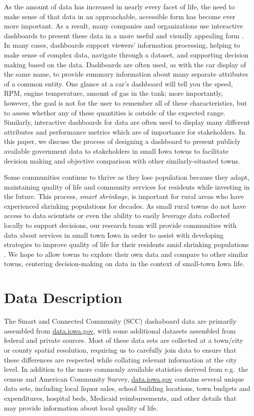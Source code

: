 \documentclass[letterpaper,inpress]{jdsart}
\begin{document}
As the amount of data has increased in nearly every facet of life, the need to make sense of that data in an approachable, accessible form has become ever more important.
As a result, many companies and organizations use interactive dashboards to present these data in a more useful and visually appealing form \citep{fisher}.
In many cases, dashboards support viewers' information processing, helping to make sense of complex data, navigate through a dataset, and supporting decision making based on the data.
Dashboards are often used, as with the car display of the same name, to provide summary information about many separate attributes of a common entity. One glance at a car's dashboard will tell you the speed, RPM, engine temperature, amount of gas in the tank; more importantly, however, the goal is not for the user to remember all of these characteristics, but to assess whether any of these quantities is outside of the expected range.
Similarly, interactive dashboards for data are often used to display many different attributes and performance metrics which are of importance for stakeholders.
In this paper, we discuss the process of designing a dashboard to present publicly available government data to stakeholders in small Iowa towns to facilitate decision making and objective comparison with other similarly-situated towns.

Some communities continue to thrive as they lose population because they adapt, maintaining quality of life and community services for residents while investing in the future. This process, \emph{smart shrinkage}, is important for rural areas who have experienced shrinking populations for decades. As small rural towns do not have access to data scientists or even the ability to easily leverage data collected locally to support decisions, our research team will provide communities with data about services in small town Iowa in order to assist with developing strategies to improve quality of life for their residents amid shrinking populations \citep{scc}. We hope to allow towns to explore their own data and compare to other similar towns, centering decision-making on data in the context of small-town Iowa life.

\section{Data Description}

The Smart and Connected Community (SCC) dashaboard data are primarily assembled from \url{data.iowa.gov}, with some additional datasets assembled from federal and private sources. Most of these data sets are collected at a town/city or county spatial resolution, requiring us to carefully join data to ensure that these differences are respected while collating relevant information at the city level. In addition to the more commonly available statistics derived from e.g.~the census and American Community Survey, \url{data.iowa.gov} contains several unique data sets, including local liquor sales, school building locations, town budgets and expenditures, hospital beds, Medicaid reimbursements, and other details that may provide information about local quality of life.
\end{document}
